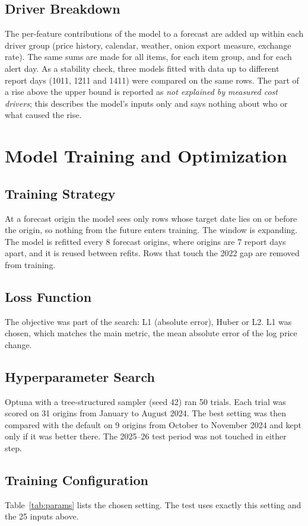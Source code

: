 \documentclass[12pt]{report}
\newcommand{\unexpl}{\emph{not explained by measured cost drivers}}
\begin{document}
\subsection{Driver Breakdown}
The per-feature contributions of the model to a forecast are added up within each driver group (price history, calendar, weather, onion export measure, exchange rate). The same sums are made for all items, for each item group, and for each alert day. As a stability check, three models fitted with data up to different report days (1011, 1211 and 1411) were compared on the same rows. The part of a rise above the upper bound is reported as \unexpl; this describes the model's inputs only and says nothing about who or what caused the rise.

\section{Model Training and Optimization}

\subsection{Training Strategy}
At a forecast origin the model sees only rows whose target date lies on or before the origin, so nothing from the future enters training. The window is expanding. The model is refitted every 8 forecast origins, where origins are 7 report days apart, and it is reused between refits. Rows that touch the 2022 gap are removed from training.

\subsection{Loss Function}
The objective was part of the search: L1 (absolute error), Huber or L2. L1 was chosen, which matches the main metric, the mean absolute error of the log price change.

\subsection{Hyperparameter Search}
Optuna \cite{optuna} with a tree-structured sampler (seed 42) ran 50 trials. Each trial was scored on 31 origins from January to August 2024. The best setting was then compared with the default on 9 origins from October to November 2024 and kept only if it was better there. The 2025--26 test period was not touched in either step.

\subsection{Training Configuration}
Table~\ref{tab:params} lists the chosen setting. The test uses exactly this setting and the 25 inputs above.
\end{document}
